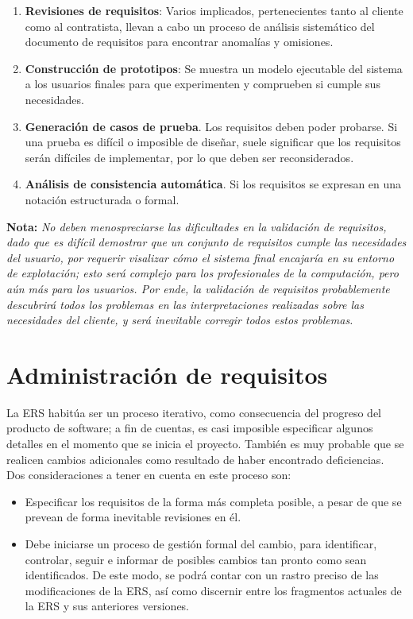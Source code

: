 \begin{enumerate}
    \item \textbf{Revisiones de requisitos}: Varios implicados, pertenecientes tanto al cliente como al contratista, llevan a cabo un proceso de análisis sistemático del documento de requisitos para encontrar anomalías y omisiones.
    \item \textbf{Construcción de prototipos}: Se muestra un modelo ejecutable del sistema a los usuarios finales para que experimenten y comprueben si cumple sus necesidades.
    \item \textbf{Generación de casos de prueba}. Los requisitos deben poder probarse. Si una prueba es difícil o imposible de diseñar, suele significar que los requisitos serán difíciles de implementar, por lo que deben ser reconsiderados.
    \item \textbf{Análisis de consistencia automática}. Si los requisitos se expresan en una notación estructurada o formal.
\end{enumerate}

\textbf{Nota:} \textit{No deben menospreciarse las dificultades en la validación de requisitos, dado que es difícil demostrar que un conjunto de requisitos cumple las necesidades del usuario, por requerir visalizar cómo el sistema final encajaría en su entorno de explotación; esto será complejo para los profesionales de la computación, pero aún más para los usuarios. Por ende, la validación de requisitos probablemente descubrirá todos los problemas en las interpretaciones realizadas sobre las necesidades del cliente, y será inevitable corregir todos estos problemas.}


\section{Administración de requisitos}

La ERS habitúa ser un proceso iterativo, como consecuencia del progreso del producto de software; a fin de cuentas, es casi imposible especificar algunos detalles en el momento que se inicia el proyecto. También es muy probable que se realicen cambios adicionales como resultado de haber encontrado deficiencias.\\

Dos consideraciones a tener en cuenta en este proceso son:

\begin{itemize}
    \item Especificar los requisitos de la forma más completa posible, a pesar de que se prevean de forma inevitable revisiones en él.
    \item Debe iniciarse un proceso de gestión formal del cambio, para identificar, controlar, seguir e informar de posibles cambios tan pronto como sean identificados. De este modo, se podrá contar con un rastro preciso de las modificaciones de la ERS, así como discernir entre los fragmentos actuales de la ERS y sus anteriores versiones.
\end{itemize}

